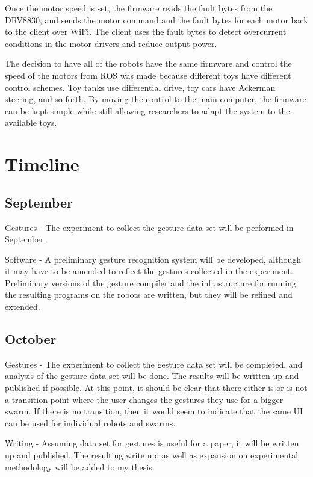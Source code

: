 \documentclass[]{article}
\begin{document}
Once the motor speed is set, the firmware reads the fault bytes from the DRV8830, and sends the motor command and the fault bytes for each motor back to the client over WiFi. 
The client uses the fault bytes to detect overcurrent conditions in the motor drivers and reduce output power. 

The decision to have all of the robots have the same firmware and control the speed of the motors from ROS was made because different toys have different control schemes. 
Toy tanks use differential drive, toy cars have Ackerman steering, and so forth. 
By moving the control to the main computer, the firmware can be kept simple while still allowing researchers to adapt the system to the available toys.

\section{Timeline}

\subsection{September}

Gestures - The experiment to collect the gesture data set will be performed in September.   

Software - A preliminary gesture recognition system will be developed, although it may have to be amended to reflect the gestures collected in the experiment. 
Preliminary versions of the gesture compiler and the infrastructure for running the resulting programs on the robots are written, but they will be refined and extended.

\subsection{October}

Gestures - The experiment to collect the gesture data set will be completed, and analysis of the gesture data set will be done. 
The results will be written up and published if possible. 
At this point, it should be clear that there either is or is not a transition point where the user changes the gestures they use for a bigger swarm. 
If there is no transition, then it would seem to indicate that the same UI can be used for individual robots and swarms. 

Writing - Assuming data set for gestures is useful for a paper, it will be written up and published. The resulting write up, as well as expansion on experimental methodology will be added to my thesis. 
\end{document}
